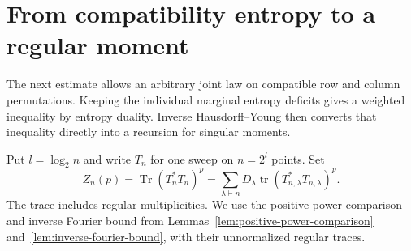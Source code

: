 \section{From compatibility entropy to a regular moment}\label{tra:duality}

The next estimate allows an arbitrary joint law on compatible row and column permutations. Keeping the individual marginal entropy deficits gives a weighted inequality by entropy duality. Inverse Hausdorff--Young then converts that inequality directly into a recursion for singular moments.

Put $l=\log_2 n$ and write $T_n$ for one sweep on $n=2^l$ points. Set
\[
 Z_n(p)=\operatorname{Tr}(T_n^*T_n)^p
 =\sum_{\lambda\vdash n}D_\lambda\operatorname{tr}(T_{n,\lambda}^*T_{n,\lambda})^p.
\]
The trace includes regular multiplicities. We use the positive-power comparison and inverse Fourier bound from Lemmas~\ref{lem:positive-power-comparison} and~\ref{lem:inverse-fourier-bound}, with their unnormalized regular traces.
\label{tra:duality:matrix-inequalities}

